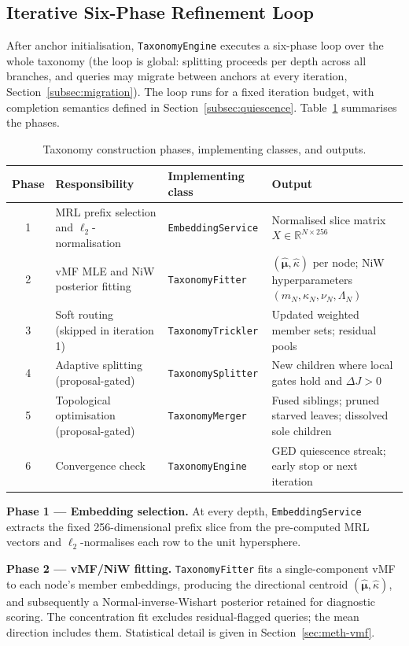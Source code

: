 \subsection{Iterative Six-Phase Refinement Loop}

After anchor initialisation, \texttt{TaxonomyEngine} executes a
six-phase loop over the whole taxonomy (the loop is global: splitting
proceeds per depth across all branches, and queries may migrate
between anchors at every iteration, Section~\ref{subsec:migration}).
The loop runs for a fixed iteration budget, with completion semantics
defined in Section~\ref{subsec:quiescence}.
Table~\ref{tab:pipeline} summarises the phases.

\begin{table}[htbp]
\centering
\caption{Taxonomy construction phases, implementing classes, and outputs.}
\label{tab:pipeline}
\begin{tabular}{clll}
\toprule
Phase & Responsibility & Implementing class & Output \\
\midrule
1 & MRL prefix selection and $\ell_2$-normalisation
& \texttt{EmbeddingService}
& Normalised slice matrix $X \in \mathbb{R}^{N \times 256}$ \\
2 & vMF MLE and NiW posterior fitting
& \texttt{TaxonomyFitter}
& $(\hat{\boldsymbol{\mu}}, \hat{\kappa})$ per node;
NiW hyperparameters $(m_N, \kappa_N, \nu_N, \Lambda_N)$ \\
3 & Soft routing (skipped in iteration 1)
& \texttt{TaxonomyTrickler}
& Updated weighted member sets; residual pools \\
4 & Adaptive splitting (proposal-gated)
& \texttt{TaxonomySplitter}
& New children where local gates hold and $\Delta J > 0$ \\
5 & Topological optimisation (proposal-gated)
& \texttt{TaxonomyMerger}
& Fused siblings; pruned starved leaves;
dissolved sole children \\
6 & Convergence check
& \texttt{TaxonomyEngine}
& GED quiescence streak; early stop or next iteration \\
\bottomrule
\end{tabular}
\end{table}

\textbf{Phase 1 --- Embedding selection.}
At every depth, \texttt{EmbeddingService} extracts the fixed
256-dimensional prefix slice from the pre-computed MRL vectors and
$\ell_2$-normalises each row to the unit hypersphere.

\textbf{Phase 2 --- vMF/NiW fitting.}
\texttt{TaxonomyFitter} fits a single-component vMF to each node's
member embeddings, producing the directional centroid
$(\hat{\boldsymbol{\mu}}, \hat{\kappa})$, and subsequently a
Normal-inverse-Wishart posterior retained for diagnostic scoring.
The concentration fit excludes residual-flagged queries; the mean
direction includes them.
Statistical detail is given in Section~\ref{sec:meth-vmf}.

